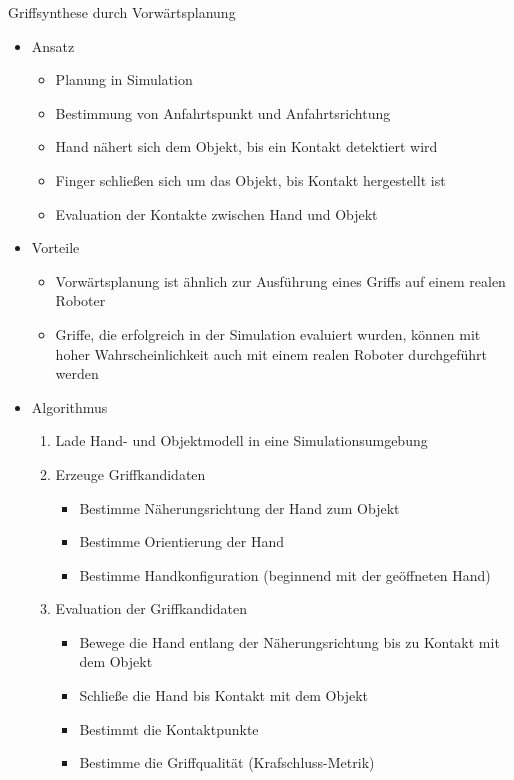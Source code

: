 \documentclass[paper=a4, fontsize=11pt]{scrartcl} %
\numberwithin{equation}{section} %
\numberwithin{figure}{section} %
\numberwithin{table}{section} %
\begin{document}
Griffsynthese durch Vorwärtsplanung
\begin{itemize}
\item Ansatz
\begin{itemize}
\item Planung in Simulation
\item Bestimmung von Anfahrtspunkt und Anfahrtsrichtung
\item Hand nähert sich dem Objekt, bis ein Kontakt detektiert wird
\item Finger schließen sich um das Objekt, bis Kontakt hergestellt ist
\item Evaluation der Kontakte zwischen Hand und Objekt
\end{itemize}
\item Vorteile
\begin{itemize}
\item Vorwärtsplanung ist ähnlich zur Ausführung eines Griffs auf einem realen Roboter
\item Griffe, die erfolgreich in der Simulation evaluiert wurden, können mit hoher Wahrscheinlichkeit auch mit einem realen Roboter durchgeführt werden
\end{itemize}
\item Algorithmus
\begin{enumerate}
\item Lade Hand- und Objektmodell in eine Simulationsumgebung
\item Erzeuge Griffkandidaten
\begin{itemize}
\item Bestimme Näherungsrichtung der Hand zum Objekt
\item Bestimme Orientierung der Hand
\item Bestimme Handkonfiguration (beginnend mit der geöffneten Hand)
\end{itemize}
\item Evaluation der Griffkandidaten
\begin{itemize}
\item Bewege die Hand entlang der Näherungsrichtung bis zu Kontakt mit dem Objekt
\item Schließe die Hand bis Kontakt mit dem Objekt
\item Bestimmt die Kontaktpunkte
\item Bestimme die Griffqualität (Krafschluss-Metrik)
\end{itemize}
\end{enumerate}
\end{itemize}
\end{document}
